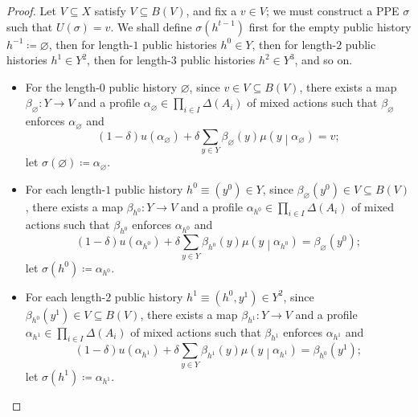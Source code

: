 \begin{proof}
	Let $V \subseteq X$ satisfy $V \subseteq B(V)$, and fix a $v \in V$; we must construct a PPE $\sigma$ such that $U(\sigma) = v$. We shall define $\sigma\left( h^{t-1} \right)$ first for the empty public history $h^{-1} \coloneqq \varnothing$, then for length-$1$ public histories $h^0 \in Y$, then for length-$2$ public histories $h^1 \in Y^2$, then for length-$3$ public histories $h^2 \in Y^3$, and so on.

	\begin{itemize}
	
		\item For the length-$0$ public history $\varnothing$, since $v \in V \subseteq B(V)$, there exists a map $\beta_{\varnothing} : Y \to V$ and a profile $\alpha_{\varnothing} \in \prod_{i \in I} \Delta(A_i)$ of mixed actions such that $\beta_{\varnothing}$ enforces $\alpha_{\varnothing}$ and
		\begin{equation*}
			(1-\delta) u\left(\alpha_{\varnothing}\right)
			+ \delta \sum_{y \in Y} \beta_{\varnothing}(y) \mu\left(y\middle|\alpha_{\varnothing}\right) 
			= v ;
		\end{equation*}
		let $\sigma\left( \varnothing \right) \coloneqq \alpha_{\varnothing}$.
	
		\item For each length-$1$ public history $h^0 \equiv \left(y^0\right) \in Y$, since $\beta_{\varnothing}\left( y^0 \right) \in V \subseteq B(V)$, there exists a map $\beta_{h^0} : Y \to V$ and a profile $\alpha_{h^0} \in \prod_{i \in I} \Delta(A_i)$ of mixed actions such that $\beta_{h^0}$ enforces $\alpha_{h^0}$ and
		\begin{equation*}
			(1-\delta) u\left(\alpha_{h^0}\right)
			+ \delta \sum_{y \in Y} \beta_{h^0}(y) \mu\left(y\middle|\alpha_{h^0}\right) 
			= \beta_{\varnothing}\left( y^0 \right) ;
		\end{equation*}
		let $\sigma\left( h^0 \right) \coloneqq \alpha_{h^0}$.
	
		\item For each length-$2$ public history $h^1 \equiv \left(h^0,y^1\right) \in Y^2$, since $\beta_{h^0}\left( y^1 \right) \in V \subseteq B(V)$, there exists a map $\beta_{h^1} : Y \to V$ and a profile $\alpha_{h^1} \in \prod_{i \in I} \Delta(A_i)$ of mixed actions such that $\beta_{h^1}$ enforces $\alpha_{h^1}$ and
		\begin{equation*}
			(1-\delta) u\left(\alpha_{h^1}\right)
			+ \delta \sum_{y \in Y} \beta_{h^1}(y) \mu\left(y\middle|\alpha_{h^1}\right) 
			= \beta_{h^0}\left( y^1 \right) ;
		\end{equation*}
		let $\sigma\left( h^1 \right) \coloneqq \alpha_{h^1}$.
	

\end{itemize}
\end{proof}
